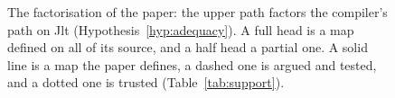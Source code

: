 \begin{figure}[tb]
\centering
{}
\caption{The factorisation of the paper: the upper path factors the compiler's path on Jlt (Hypothesis~\ref{hyp:adequacy}).
A full head is a map defined on all of its source, and a half head a partial one.
A solid line is a map the paper defines, a dashed one is argued and tested, and a dotted one is trusted (Table~\ref{tab:support}).}
\label{fig:arrows}
\end{figure}

